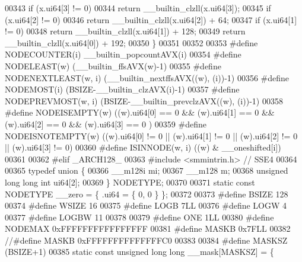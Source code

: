 \begin{DoxyCode}
00343         \textcolor{keywordflow}{if} (x.ui64[3] != 0)
00344                 \textcolor{keywordflow}{return} \_\_builtin\_clzll(x.ui64[3]);
00345         \textcolor{keywordflow}{if} (x.ui64[2] != 0)
00346                 \textcolor{keywordflow}{return} \_\_builtin\_clzll(x.ui64[2]) + 64;
00347         \textcolor{keywordflow}{if} (x.ui64[1] != 0)
00348                 \textcolor{keywordflow}{return} \_\_builtin\_clzll(x.ui64[1]) + 128;
00349         \textcolor{keywordflow}{return} \_\_builtin\_clzll(x.ui64[0]) + 192;
00350 \}
00351 
00352 
00353 \textcolor{preprocessor}{#define NODECOUNTER(i) \_\_builtin\_popcountAVX(i)}
00354 \textcolor{preprocessor}{#define NODELEAST(w) (\_\_builtin\_ffsAVX(w)-1)}
00355 \textcolor{preprocessor}{#define NODENEXTLEAST(w, i) (\_\_builtin\_nextffsAVX((w), (i))-1)}
00356 \textcolor{preprocessor}{#define NODEMOST(i) (BSIZE-\_\_builtin\_clzAVX(i)-1)}
00357 \textcolor{preprocessor}{#define NODEPREVMOST(w, i) (BSIZE-\_\_builtin\_prevclzAVX((w), (i))-1)}
00358 \textcolor{preprocessor}{#define NODEISEMPTY(w) ((w).ui64[0] == 0 && (w).ui64[1] == 0 && (w).ui64[2] == 0  && (w).ui64[3] == 0 )}
00359 \textcolor{preprocessor}{#define NODEISNOTEMPTY(w) ((w).ui64[0] != 0 || (w).ui64[1] != 0 || (w).ui64[2] != 0 || (w).ui64[3] != 0)}
00360 \textcolor{preprocessor}{#define ISINNODE(w, i) ((w) & \_\_oneshifted[i])                                                  }
00361 \textcolor{preprocessor}{}
00362 \textcolor{preprocessor}{#elif \_ARCH128\_}
00363 \textcolor{preprocessor}{#include <smmintrin.h>} \textcolor{comment}{// SSE4}
00364 
00365 \textcolor{keyword}{typedef} \textcolor{keyword}{union }\{
00366     \_\_m128i mi;
00367     \_\_m128 m;
00368     \textcolor{keywordtype}{unsigned} \textcolor{keywordtype}{long} \textcolor{keywordtype}{long} \textcolor{keywordtype}{int} ui64[2];
00369 \} NODETYPE; 
00370 
00371 \textcolor{keyword}{static} \textcolor{keyword}{const} NODETYPE \_\_zero = \{ .ui64 = \{ 0, 0 \} \};
00372 
00373 \textcolor{preprocessor}{#define BSIZE 128}
00374 \textcolor{preprocessor}{#define WSIZE 16}
00375 \textcolor{preprocessor}{#define LOGB 7LL}
00376 \textcolor{preprocessor}{#define LOGW 4}
00377 \textcolor{preprocessor}{#define LOGBW 11}
00378 
00379 \textcolor{preprocessor}{#define ONE 1LL}
00380 \textcolor{preprocessor}{#define NODEMAX 0xFFFFFFFFFFFFFFFF}
00381 \textcolor{preprocessor}{#define MASKB 0x7FLL}
00382 \textcolor{comment}{//#define MASKB 0xFFFFFFFFFFFFFFC0}
00383 
00384 \textcolor{preprocessor}{#define MASKSZ (BSIZE+1)}
00385 \textcolor{keyword}{static} \textcolor{keyword}{const} \textcolor{keywordtype}{unsigned} \textcolor{keywordtype}{long} \textcolor{keywordtype}{long} \_\_mask[MASKSZ] = \{

\end{DoxyCode}
